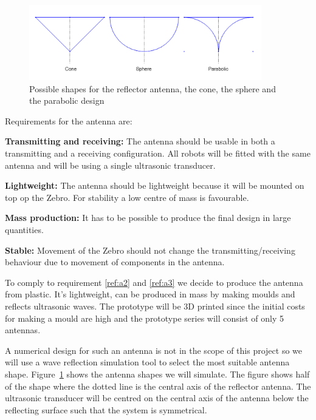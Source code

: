 \begin{figure}[H]
\centering
\includegraphics[width=0.9\textwidth]{Figures/ant_shapes.PNG}
\caption{Possible shapes for the reflector antenna, the cone, the sphere and the parabolic design}
\label{fig:shapes}
\end{figure}

Requirements for the antenna are:

\begin{enumerate}[label={[A.\arabic*]}]
  \item
  \textbf{Transmitting and receiving:} The antenna should be usable in both a transmitting and a receiving configuration. All robots will be fitted with the same antenna and will be using a single ultrasonic transducer. \label{ref:T_R}
  \item\label{ref:a2}
  \textbf{Lightweight:} The antenna should be lightweight because it will be mounted on top op the Zebro. For stability a low centre of mass is favourable.
  \item\label{ref:a3}
  \textbf{Mass production:} It has to be possible to produce the final design in large quantities.
  \item
  \textbf{Stable:} Movement of the Zebro should not change the transmitting/receiving behaviour due to movement of components in the antenna.
\end{enumerate}

To comply to requirement \ref{ref:a2} and \ref{ref:a3} we decide to produce the antenna from plastic. It's lightweight, can be produced in mass by making moulds and reflects ultrasonic waves.
The prototype will be 3D printed since the initial costs for making a mould are high and the prototype series will consist of only 5 antennas.

A numerical design for such an antenna is not in the scope of this project so we will use a wave reflection simulation tool to select the most suitable antenna shape.
Figure~\ref{fig:shapes} shows the antenna shapes we will simulate.
The figure shows half of the shape where the dotted line is the central axis of the reflector antenna.
The ultrasonic transducer will be centred on the central axis of the antenna below the reflecting surface such that the system is symmetrical.

